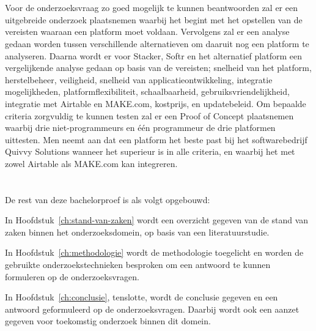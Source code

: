 \section{}%
\label{sec:onderzoeksdoelstelling}
Voor de onderzoeksvraag zo goed mogelijk te kunnen beantwoorden zal er een uitgebreide onderzoek plaatsnemen waarbij het begint met het opstellen 
van de vereisten waaraan een platform moet voldaan. Vervolgens zal er een analyse gedaan worden tussen verschillende alternatieven om daaruit nog een platform 
te analyseren. Daarna wordt er voor Stacker, Softr en het alternatief platform een vergelijkende analyse gedaan op basis van de vereisten; snelheid van het platform, 
herstelbeheer, veiligheid, snelheid van applicatieontwikkeling, integratie mogelijkheden, platformflexibiliteit, schaalbaarheid, gebruiksvriendelijkheid, integratie met 
Airtable en MAKE.com, kostprijs, en updatebeleid. Om bepaalde criteria zorgvuldig te kunnen testen zal er een Proof of Concept plaatsnemen waarbij drie 
niet-programmeurs en één programmeur de drie platformen uittesten. Men neemt aan dat een platform het beste past bij het softwarebedrijf Quivvy Solutions wanneer het superieur is in alle criteria, en 
waarbij het met zowel Airtable als MAKE.com kan integreren.

\section{}%
\label{sec:opzet-bachelorproef}


De rest van deze bachelorproef is als volgt opgebouwd:

In Hoofdstuk~\ref{ch:stand-van-zaken} wordt een overzicht gegeven van de stand van zaken binnen het onderzoeksdomein, op basis van een literatuurstudie.

In Hoofdstuk~\ref{ch:methodologie} wordt de methodologie toegelicht en worden de gebruikte onderzoekstechnieken besproken om een antwoord te kunnen formuleren op de onderzoeksvragen.


In Hoofdstuk~\ref{ch:conclusie}, tenslotte, wordt de conclusie gegeven en een antwoord geformuleerd op de onderzoeksvragen. Daarbij wordt ook een aanzet gegeven voor toekomstig onderzoek binnen dit domein.